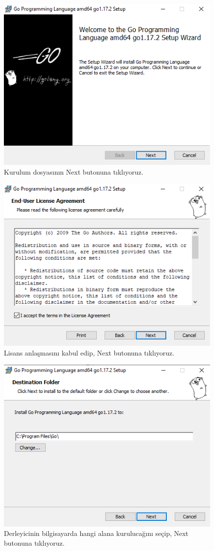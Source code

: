 \vspace{10mm}

\begin{figure}[!htb]
    \centering
    \includegraphics[width=0.6\linewidth]{00-images/03-installation.png}
    \caption{Kurulum dosyasının Next butonuna tıklıyoruz. }
    \label{fig:my_label}
\end{figure}

\vspace{5mm}

\vspace{10mm}

\begin{figure}[!htb]
    \centering
    \includegraphics[width=0.6\linewidth]{00-images/04-installation.png}
    \caption{Lisans anlaşmasını kabul edip, Next butonuna tıklıyoruz. }
    \label{fig:my_label}
\end{figure}

\vspace{5mm}


\begin{figure}[!htb]
    \centering
    \includegraphics[width=0.6\linewidth]{00-images/05-installation.png}
    \caption{Derleyicinin bilgisayarda hangi alana kurulucağını seçip, Next butonuna tıklıyoruz.}
    \label{fig:my_label}
\end{figure}

